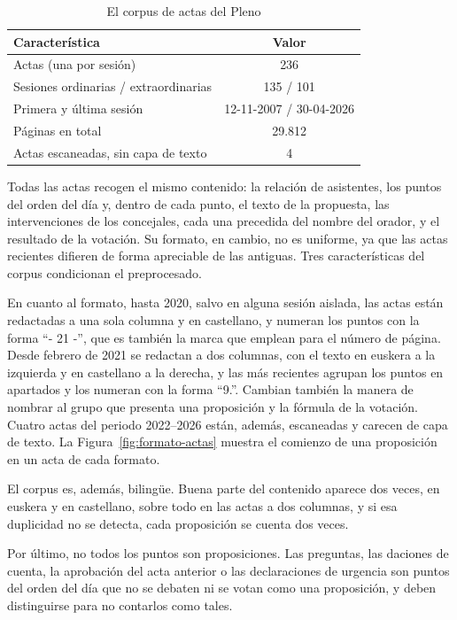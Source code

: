 \documentclass[11pt, a4paper]{report}
\begin{document}
	\begin{table}[H]
		\centering
		\begin{tabular}{|l|c|}
			\hline
			\rowcolor{tabla-header}
			\textbf{Característica} & \textbf{Valor} \\
			\hline
			Actas (una por sesión) & 236 \\
			\hline
			\rowcolor{fila-alterna}
			Sesiones ordinarias / extraordinarias & 135 / 101 \\
			\hline
			Primera y última sesión & 12-11-2007 / 30-04-2026 \\
			\hline
			\rowcolor{fila-alterna}
			Páginas en total & 29.812 \\
			\hline
			Actas escaneadas, sin capa de texto & 4 \\
			\hline
		\end{tabular}
		\caption{El corpus de actas del Pleno}
		\label{tab:corpus}
	\end{table}

	Todas las actas recogen el mismo contenido: la relación de asistentes, los
	puntos del orden del día y, dentro de cada punto, el texto de la propuesta,
	las intervenciones de los concejales, cada una precedida del nombre del
	orador, y el resultado de la votación. Su formato, en cambio, no es uniforme, ya que las actas recientes difieren de forma apreciable de las antiguas. Tres características del corpus condicionan
	el preprocesado.

	En cuanto al formato, hasta 2020, salvo en alguna sesión
	aislada, las actas están redactadas a una sola columna y en castellano, y
	numeran los puntos con la forma ``- 21 -'', que es también la marca que
	emplean para el número de página. Desde febrero de 2021 se redactan a dos columnas, con el texto en euskera a la izquierda y en
	castellano a la derecha, y las más recientes agrupan los puntos en apartados y
	los numeran con la forma ``9.''. Cambian también la manera de nombrar al
	grupo que presenta una proposición y la fórmula de la votación. Cuatro actas
	del periodo 2022--2026 están, además, escaneadas y carecen de capa de texto. La
	Figura~\ref{fig:formato-actas} muestra el comienzo de una proposición en un acta de cada
	formato.

	El corpus es, además, bilingüe. Buena parte del contenido aparece dos
	veces, en euskera y en castellano, sobre todo en las actas a dos columnas, y
	si esa duplicidad no se detecta, cada proposición se cuenta dos veces.

	Por último, no todos los puntos son proposiciones. Las preguntas, las
	daciones de cuenta, la aprobación del acta anterior o las declaraciones de
	urgencia son puntos del orden del día que no se debaten ni se votan como una
	proposición, y deben distinguirse para no contarlos como tales.
\end{document}
